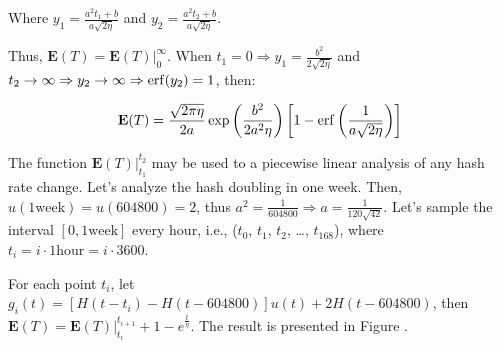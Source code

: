 Where $y_1 = \frac{a^2 t_1 + b}{a \sqrt{2 \eta}}$ and $y_2 = \frac{a^2 t_2 + b}{a \sqrt{2 \eta}}$.

Thus, $\mathbf{E}(T) = \mathbf{E}(T)|_0^\infty$. When $t_1 = 0 \Rightarrow y_1 = \frac{b^2}{2 \sqrt{2 \eta}}$ and $t_2 \rightarrow \infty \Rightarrow y_2 \rightarrow \infty \Rightarrow \operatorname{erf}(y_2) = 1$, then:

$$
\mathbf{E}(T) = \frac{\sqrt{2 \pi \eta}}{2a} \exp \left( \frac{b^2}{2a^2 \eta} \right) \left[1 - \operatorname{erf}\left(\frac{1}{a \sqrt{2 \eta}}\right)\right]
$$

The function $\mathbf{E}(T)|_{t_1}^{t_2}$ may be used to a piecewise linear analysis of any hash rate change. Let's analyze the hash doubling in one week. Then, $u(1 \text{week}) = u(604800) = 2$, thus $a^2 = \frac{1}{604800} \Rightarrow a = \frac{1}{120 \sqrt{42}}$. Let's sample the interval $[0, 1 \text{week}]$ every hour, i.e., ($t_0$, $t_1$, $t_2$, \dots, $t_168$), where $t_i = i \cdot 1 \text{hour} = i \cdot 3600$.

For each point $t_i$, let $g_i(t) = [H(t-t_i) - H(t-604800)] u(t) + 2 H(t-604800)$, then $\mathbf{E}(T) = \mathbf{E}(T)|_{t_i}^{t_{i+1}} + 1 - e^{\frac{t}{\eta}}$. The result is presented in Figure .

